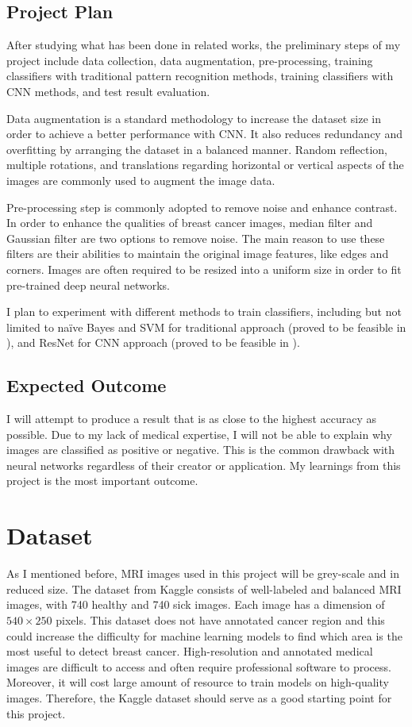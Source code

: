 \documentclass{article}
\begin{document}
\subsection{Project Plan}
After studying what has been done in related works, the preliminary steps of my project include data collection, data augmentation, pre-processing, training classifiers with traditional pattern recognition methods, training classifiers with CNN methods, and test result evaluation.

Data augmentation is a standard methodology to increase the dataset size in order to achieve a better performance with CNN. It also reduces redundancy and overfitting by arranging the dataset in a balanced manner. Random reflection, multiple rotations, and translations regarding horizontal or vertical aspects of the images are commonly used to augment the image data.

Pre-processing step is commonly adopted to remove noise and enhance contrast. In order to enhance the qualities of breast cancer images, median filter and Gaussian filter are two options to remove noise. The main reason to use these filters are their abilities to maintain the original image features, like edges and corners. Images are often required to be resized into a uniform size in order to fit pre-trained deep neural networks.

I plan to experiment with different methods to train classifiers, including but not limited to naïve Bayes and SVM for traditional approach (proved to be feasible in \cite{s22010203}), and ResNet for CNN approach (proved to be feasible in \cite{ALJUAID2022106951}\cite{diagnostics12081812}).

\subsection{Expected Outcome}
I will attempt to produce a result that is as close to the highest accuracy as possible. Due to my lack of medical expertise, I will not be able to explain why images are classified as positive or negative. This is the common drawback with neural networks regardless of their creator or application. My learnings from this project is the most important outcome.

\section{Dataset}
As I mentioned before, MRI images used in this project will be grey-scale and in reduced size. The dataset from Kaggle\cite{uzairkhan45} consists of well-labeled and balanced MRI images, with 740 healthy and 740 sick images. Each image has a dimension of $540\times 250$ pixels. This dataset does not have annotated cancer region and this could increase the difficulty for machine learning models to find which area is the most useful to detect breast cancer. High-resolution and annotated medical images are difficult to access and often require professional software to process. Moreover, it will cost large amount of resource to train models on high-quality images. Therefore, the Kaggle dataset should serve as a good starting point for this project.

\newpage

\printbibliography[title={References}]
\end{document}
